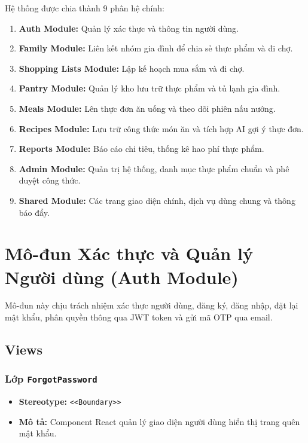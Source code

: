 \documentclass[12pt,a4paper]{article}
\begin{document}
Hệ thống được chia thành 9 phân hệ chính:
\begin{enumerate}
    \item \textbf{Auth Module:} Quản lý xác thực và thông tin người dùng.
    \item \textbf{Family Module:} Liên kết nhóm gia đình để chia sẻ thực phẩm và đi chợ.
    \item \textbf{Shopping Lists Module:} Lập kế hoạch mua sắm và đi chợ.
    \item \textbf{Pantry Module:} Quản lý kho lưu trữ thực phẩm và tủ lạnh gia đình.
    \item \textbf{Meals Module:} Lên thực đơn ăn uống và theo dõi phiên nấu nướng.
    \item \textbf{Recipes Module:} Lưu trữ công thức món ăn và tích hợp AI gợi ý thực đơn.
    \item \textbf{Reports Module:} Báo cáo chi tiêu, thống kê hao phí thực phẩm.
    \item \textbf{Admin Module:} Quản trị hệ thống, danh mục thực phẩm chuẩn và phê duyệt công thức.
    \item \textbf{Shared Module:} Các trang giao diện chính, dịch vụ dùng chung và thông báo đẩy.
\end{enumerate}

\newpage
\section{Mô-đun Xác thực và Quản lý Người dùng (Auth Module)}

Mô-đun này chịu trách nhiệm xác thực người dùng, đăng ký, đăng nhập, đặt lại mật khẩu, phân quyền thông qua JWT token và gửi mã OTP qua email.

\subsection{Views}

\subsubsection{Lớp \texttt{ForgotPassword}}
\begin{itemize}[leftmargin=*]
    \item \textbf{Stereotype:} \texttt{\textless{}\textless{}Boundary\textgreater{}\textgreater{}}
    \item \textbf{Mô tả:} Component React quản lý giao diện người dùng hiển thị trang quên mật khẩu.
\end{itemize}
\end{document}
